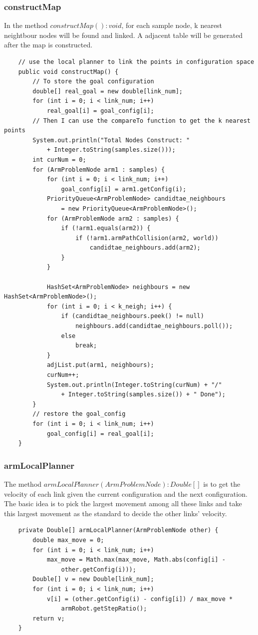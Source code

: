 \documentclass{article}
\begin{document}
\subsubsection{constructMap}
In the method $constructMap():void$, for each sample node, k nearest neightbour nodes will be found and linked. A adjacent table will be generated after the map is constructed.
\begin{lstlisting}
	// use the local planner to link the points in configuration space
	public void constructMap() {
		// To store the goal configuration
		double[] real_goal = new double[link_num];
		for (int i = 0; i < link_num; i++)
			real_goal[i] = goal_config[i];
		// Then I can use the compareTo function to get the k nearest points
		System.out.println("Total Nodes Construct: " 
			+ Integer.toString(samples.size()));
		int curNum = 0;
		for (ArmProblemNode arm1 : samples) {
			for (int i = 0; i < link_num; i++)
				goal_config[i] = arm1.getConfig(i);
			PriorityQueue<ArmProblemNode> candidtae_neighbours 
				= new PriorityQueue<ArmProblemNode>();
			for (ArmProblemNode arm2 : samples) {
				if (!arm1.equals(arm2)) {
					if (!arm1.armPathCollision(arm2, world))
						candidtae_neighbours.add(arm2);
				}
			}

			HashSet<ArmProblemNode> neighbours = new HashSet<ArmProblemNode>();
			for (int i = 0; i < k_neigh; i++) {
				if (candidtae_neighbours.peek() != null)
					neighbours.add(candidtae_neighbours.poll());
				else
					break;
			}
			adjList.put(arm1, neighbours);
			curNum++;
			System.out.println(Integer.toString(curNum) + "/" 
				+ Integer.toString(samples.size()) + " Done");
		}
		// restore the goal_config
		for (int i = 0; i < link_num; i++)
			goal_config[i] = real_goal[i];
	}
\end{lstlisting} 

\subsubsection{armLocalPlanner}
The method $armLocalPlanner(ArmProblemNode):Double[]$ is to get the velocity of each link given the current configuration and the next configuration. The basic idea is to pick the largest movement among all these links and take this  largest movement as the standard to decide the other links' velocity.

\begin{lstlisting}
	private Double[] armLocalPlanner(ArmProblemNode other) {
		double max_move = 0;
		for (int i = 0; i < link_num; i++)
			max_move = Math.max(max_move, Math.abs(config[i] - 
				other.getConfig(i)));
		Double[] v = new Double[link_num];
		for (int i = 0; i < link_num; i++)
			v[i] = (other.getConfig(i) - config[i]) / max_move * 
				armRobot.getStepRatio();
		return v;
	}
\end{lstlisting}
\end{document}
